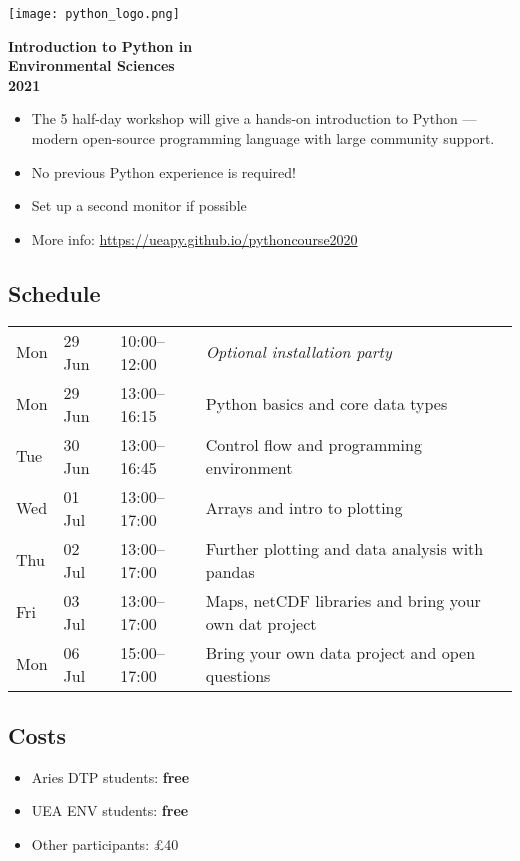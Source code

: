 \documentclass[paper=a4]{scrartcl}
\newcommand*{\pyitem}{\item [{\texttt{[image: python\_logo.png]}}]}
\begin{document}
\pagestyle{empty} %

\begin{center}
\begin{minipage}{0.2\linewidth}
    \texttt{[image: python\_logo.png]}
    \vspace{0.5cm}
\end{minipage}

\huge \textbf{Introduction to Python in \\ Environmental Sciences \\ 2021}

\end{center}

\begin{itemize}
\pyitem The 5 half-day workshop will give a hands-on introduction to Python --- modern open-source programming language with large community support.
\pyitem No previous Python experience is required!
\pyitem Set up a second monitor if possible
\pyitem More info: \url{https://ueapy.github.io/pythoncourse2020}
\end{itemize}


\subsection*{Schedule}
\begin{center}
\begin{tabular}{llll}
Mon & 29 Jun & 10:00--12:00 & \textit {Optional installation party}\\
Mon & 29 Jun & 13:00--16:15 & Python basics and core data types\\
Tue & 30 Jun  & 13:00--16:45 & Control flow and programming environment \\
Wed & 01 Jul & 13:00--17:00 & Arrays and intro to plotting\\
Thu & 02 Jul & 13:00--17:00 & Further plotting and data analysis with pandas\\
Fri & 03 Jul & 13:00--17:00 & Maps, netCDF libraries and bring your own dat project\\
Mon & 06 Jul & 15:00--17:00 & Bring your own data project and open questions\\

\end{tabular}
\end{center}

\subsection*{Costs}
\begin{itemize}
\pyitem Aries DTP students: \textbf{free}
\pyitem UEA ENV students: \textbf{free}
\pyitem Other participants: \pounds 40
\end{itemize}
\vspace{-0.5cm}
\end{document}
